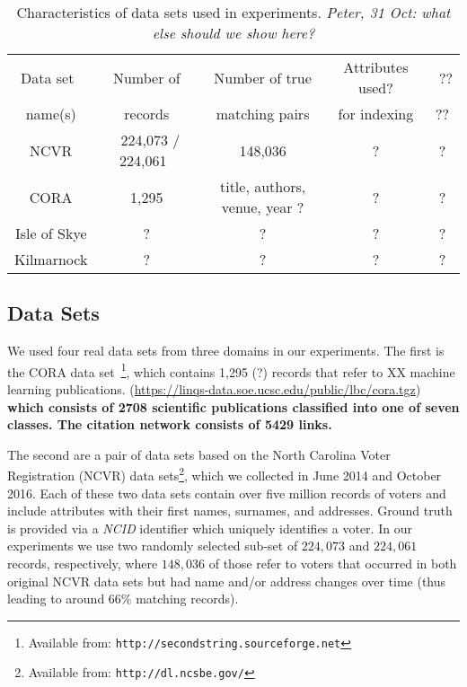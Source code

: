 \documentclass{llncs}
\begin{document}
\begin{table}[t]
\caption{Characteristics of data sets used in experiments.
  \emph{Peter, 31 Oct: what else should we show here?}}
 \label{table-datasets}
  \centering
  \begin{scriptsize}
  \begin{tabular}{ccccc}
  \hline\noalign{\smallskip}
  Data set~ & ~Number of~ & ~Number of true~
   & Attributes used? & ~?? \\
  name(s)  & records   & matching pairs &
    for indexing & ?? \\
  \noalign{\smallskip}
  \hline
  \noalign{\smallskip}
  NCVR  & ~224,073 / 224,061~ & ~148,036~ & ? & ? \\
  CORA  & 1,295             & title, authors, venue, year ? & ?
    & ? \\
  Isle of Skye & ? & ?
    & ? & ? \\
  Kilmarnock  & ? & ? & ? & ? \\
  \hline
  \end{tabular}
  \end{scriptsize}
\end{table}


\subsection{Data Sets}
\label{sec-data}

We used four real data sets from three domains in our experiments. The
first is the CORA data set~\footnote{Available from:
\texttt{http://secondstring.sourceforge.net}}, which contains 1,295
(?) records that refer to XX machine learning publications.
 (\url{https://linqs-data.soe.ucsc.edu/public/lbc/cora.tgz}) \textbf{ which consists of 2708 scientific publications classified into one of seven classes. The citation network consists of 5429 links.}

The second are a pair of data sets based on the North Carolina Voter
Registration (NCVR) data sets\footnote{Available from: \texttt{http://dl.ncsbe.gov/}}, which we collected in June 2014 and
October 2016. Each of these two data sets contain over five million
records of voters and include attributes with their first names,
surnames, and addresses. Ground truth is provided via a \emph{NCID}
identifier which uniquely identifies a voter. In our experiments we
use two randomly selected sub-set of $224,073$ and $224,061$ records,
respectively, where $148,036$ of those refer to voters that occurred
in both original NCVR data sets but had name and/or address changes
over time (thus leading to around $66\%$ matching records).
\end{document}
